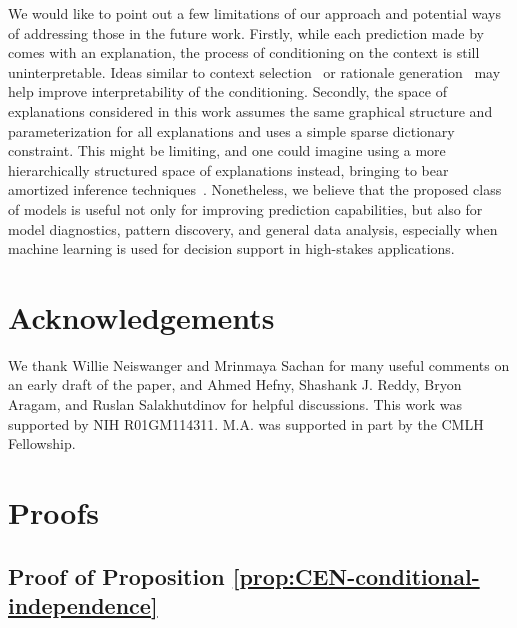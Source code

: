 \documentclass[twoside,11pt]{article}
\begin{document}
We would like to point out a few limitations of our approach and potential ways of addressing those in the future work.
Firstly, while each prediction made by {\CEN} comes with an explanation, the process of conditioning on the context is still uninterpretable.
Ideas similar to context selection~\citep{liu2017context} or rationale generation~\citep{lei2016rationalizing} may help improve interpretability of the conditioning.
Secondly, the space of explanations considered in this work assumes the same graphical structure and parameterization for all explanations and uses a simple sparse dictionary constraint.
This might be limiting, and one could imagine using a more hierarchically structured space of explanations instead, bringing to bear amortized inference techniques~\citep{rudolph2017structured}.
Nonetheless, we believe that the proposed class of models is useful not only for improving prediction capabilities, but also for model diagnostics, pattern discovery, and general data analysis, especially when machine learning is used for decision support in high-stakes applications.
 
\section{Acknowledgements}
We thank Willie Neiswanger and Mrinmaya Sachan for many useful comments on an early draft of the paper, and Ahmed Hefny, Shashank J. Reddy, Bryon Aragam, and Ruslan Salakhutdinov for helpful discussions.
This work was supported by NIH R01GM114311.
M.A. was supported in part by the CMLH Fellowship.
 
\clearpage

\appendix
\setcounter{equation}{0}
\renewcommand{\theequation}{\Alph{section}.\arabic{equation}}

\section{Proofs}
\label{app:proofs}

\subsection{Proof of Proposition \ref{prop:CEN-conditional-independence}}
\label{proof:CEN-conditional-independence}
\end{document}
